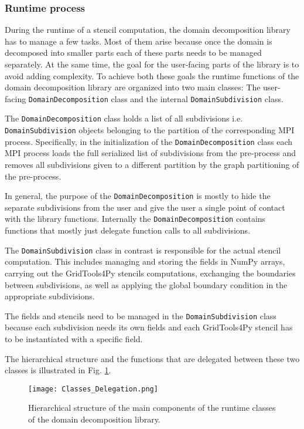 \subsubsection{Runtime process}
\label{sec:runtime_process}
During the runtime of a stencil computation, the domain decomposition library has to manage a few tasks.
Most of them arise because once the domain is decomposed into smaller parts each of these parts needs to be managed separately.
At the same time, the goal for the user-facing parts of the library is to avoid adding complexity.
To achieve both these goals the runtime functions of the domain decomposition library are organized into two main classes:
The user-facing \texttt{DomainDecomposition} class and the internal \texttt{DomainSubdivision} class.

The \texttt{DomainDecomposition} class holds a list of all subdivisions i.e. \texttt{DomainSubdivision} objects belonging to the partition of the corresponding MPI process.
Specifically, in the initialization of the \texttt{DomainDecomposition} class each MPI process loads the full serialized list of subdivisions from the pre-process and removes all subdivisions given to a different partition by the graph partitioning of the pre-process.

In general, the purpose of the \texttt{DomainDecomposition} is mostly to hide the separate subdivisions from the user and give the user a single point of contact with the library functions.
Internally the \texttt{DomainDecomposition} contains functions that mostly just delegate function calls to all subdivisions.

The \texttt{DomainSubdivision} class in contrast is responsible for the actual stencil computation.
This includes managing and storing the fields in NumPy arrays, carrying out the GridTools4Py stencils computations, exchanging the boundaries between subdivisions, as well as applying the global boundary condition in the appropriate subdivisions.

The fields and stencils need to be managed in the \texttt{DomainSubdivision} class because each subdivision needs its own fields and each GridTools4Py stencil has to be instantiated with a specific field.

The hierarchical structure and the functions that are delegated between these two classes is illustrated in Fig. \ref{fig:classes_chart}.

\begin{figure}
\centering
\texttt{[image: Classes\_Delegation.png]}
\caption{Hierarchical structure of the main components of the runtime classes of the domain decomposition library.}
\label{fig:classes_chart}
\end{figure}

